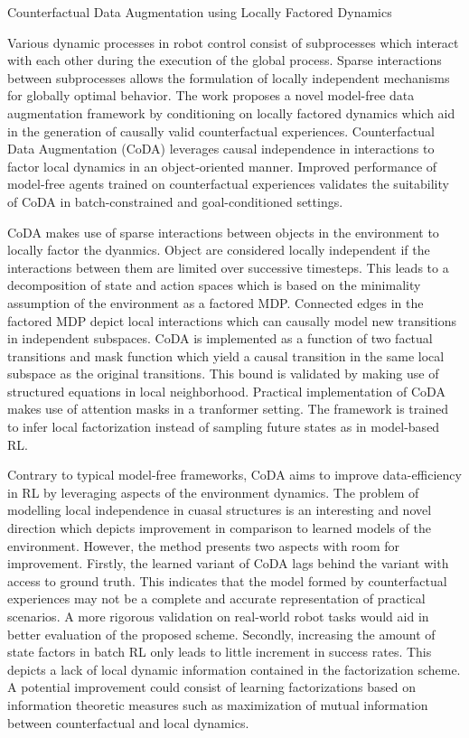 \documentclass[11pt,letterpaper]{article}
\begin{document}
\begin{center}
  \large{Counterfactual Data Augmentation using Locally Factored Dynamics}
\end{center}

Various dynamic processes in robot control consist of subprocesses which interact with each other during the execution of the global process. Sparse interactions between subprocesses allows the formulation of locally independent mechanisms for globally optimal behavior. The work proposes a novel model-free data augmentation framework by conditioning on locally factored dynamics which aid in the generation of causally valid counterfactual experiences. Counterfactual Data Augmentation (CoDA) leverages causal independence in interactions to factor local dynamics in an object-oriented manner. Improved performance of model-free agents trained on counterfactual experiences validates the suitability of CoDA in batch-constrained and goal-conditioned settings. 

CoDA makes use of sparse interactions between objects in the environment to locally factor the dyanmics. Object are considered locally independent if the interactions between them are limited over successive timesteps. This leads to a decomposition of state and action spaces which is based on the minimality assumption of the environment as a factored MDP. Connected edges in the factored MDP depict local interactions which can causally model new transitions in independent subspaces. CoDA is implemented as a function of two factual transitions and mask function which yield a causal transition in the same local subspace as the original transitions. This bound is validated by making use of structured equations in local neighborhood. Practical implementation of CoDA makes use of attention masks in a tranformer setting. The framework is trained to infer local factorization instead of sampling future states as in model-based RL. 

Contrary to typical model-free frameworks, CoDA aims to improve data-efficiency in RL by leveraging aspects of the environment dynamics. The problem of modelling local independence in cuasal structures is an interesting and novel direction which depicts improvement in comparison to learned models of the environment. However, the method presents two aspects with room for improvement. Firstly, the learned variant of CoDA lags behind the variant with access to ground truth. This indicates that the model formed by counterfactual experiences may not be a complete and accurate representation of practical scenarios. A more rigorous validation on real-world robot tasks would aid in better evaluation of the proposed scheme. Secondly, increasing the amount of state factors in batch RL only leads to little increment in success rates. This depicts a lack of local dynamic information contained in the factorization scheme. A potential improvement could consist of learning factorizations based on information theoretic measures such as maximization of mutual information between counterfactual and local dynamics. 
\end{document}
